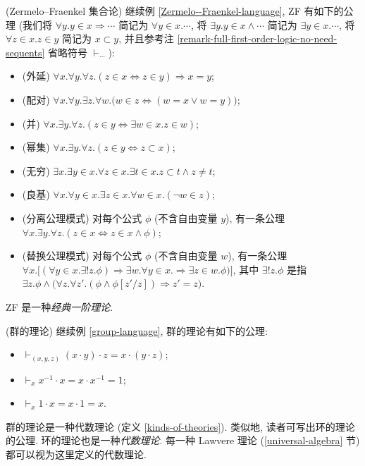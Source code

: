 \begin{example}
	{(Zermelo--Fraenkel 集合论)}
	继续例 \ref{Zermelo--Fraenkel-language}, ZF 有如下的公理 (我们将 $\forall y.y\in x\Rightarrow\cdots$ 简记为 $\forall y\in x.\cdots$, 将 $\exists y.y\in x\land\cdots$ 简记为 $\exists y\in x.\cdots$, 将 $\forall z\in x.z\in y$ 简记为 $x\subset y$, 并且参考注 \ref{remark-full-first-order-logic-no-need-sequents} 省略符号 $\vdash_{\cdots}$):
	\begin{itemize}
		\item (外延) $\forall x.\forall y.\forall z. (z\in x  \Leftrightarrow z\in y) \Rightarrow x=y$;
		\item (配对) $\forall x.\forall y.\exists z.\forall w.\big(w\in z \Leftrightarrow (w=x \lor w=y)\big)$;
		\item (并) $\forall x.\exists y.\forall z. (z\in y \Leftrightarrow \exists w\in x. z\in w)$;
		\item (幂集) $\forall x.\exists y.\forall z. (z\in y \Leftrightarrow z\subset x)$;
		\item (无穷) $\exists x.\exists y\in x.\forall z\in x.\exists t\in x.z\subset t\land z\neq t$;
		\item (良基) $\forall x. \forall y\in x. \exists z\in x. \forall w\in x.(\neg w\in z)$;
		\item (分离公理模式) 对每个公式 $\phi$ (不含自由变量 $y$), 有一条公理 $\forall x.\exists y.\forall z. (z\in x\Leftrightarrow z\in x\land \phi)$;
		\item (替换公理模式) 对每个公式 $\phi$ (不含自由变量 $w$), 有一条公理 $\forall x.\big[(\forall y\in x.\exists ! z. \phi)
		\Rightarrow \exists w.\forall y\in x. \Rightarrow \exists z\in w.\phi)\big]$, 其中 $\exists ! z.\phi$ 是指 $\exists z.\phi \land\big( \forall z.\forall z'. (\phi\land\phi[z'/z])\Rightarrow z'=z\big)$.
	\end{itemize}
	ZF 是一种\emph{经典一阶理论}.
\end{example}

\begin{example}
	[label={theory-of-groups}]
	{(群的理论)}
	继续例 \ref{group-language}, 群的理论有如下的公理:
	\begin{itemize}
		\item $\vdash_{(x,y,z)}(x\cdot y)\cdot z = x\cdot (y\cdot z)$;
		\item $\vdash_x x^{-1}\cdot x = x\cdot x^{-1} = 1$;
		\item $\vdash_x 1\cdot x = x\cdot 1 = x$.
	\end{itemize}
	群的理论是一种代数理论 (定义 \ref{kinds-of-theories}).
	类似地, 读者可写出环的理论的公理. 环的理论也是一种\emph{代数理论}. 每一种 Lawvere 理论 (\ref{universal-algebra} 节) 都可以视为这里定义的代数理论.
\end{example}

